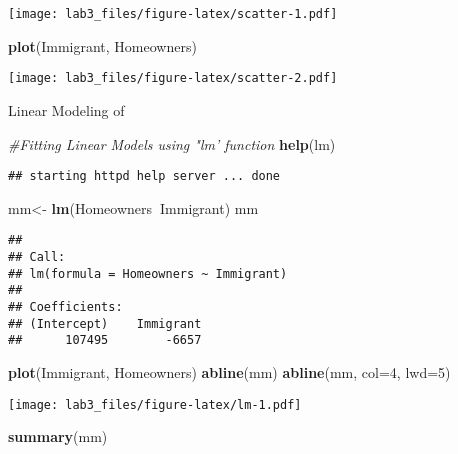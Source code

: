 \documentclass[
]{article}
\newenvironment{Shaded}{\begin{snugshade}}{\end{snugshade}}
\newcommand{\CommentTok}[1]{\textcolor[rgb]{0.56,0.35,0.01}{\textit{#1}}}
\newcommand{\DataTypeTok}[1]{\textcolor[rgb]{0.13,0.29,0.53}{#1}}
\newcommand{\DecValTok}[1]{\textcolor[rgb]{0.00,0.00,0.81}{#1}}
\newcommand{\KeywordTok}[1]{\textcolor[rgb]{0.13,0.29,0.53}{\textbf{#1}}}
\newcommand{\NormalTok}[1]{#1}
\newcommand{\OperatorTok}[1]{\textcolor[rgb]{0.81,0.36,0.00}{\textbf{#1}}}
\newcommand{\StringTok}[1]{\textcolor[rgb]{0.31,0.60,0.02}{#1}}
\begin{document}
\texttt{[image: lab3\_files/figure-latex/scatter-1.pdf]}

\begin{Shaded}
\begin{Highlighting}[]
\KeywordTok{plot}\NormalTok{(Immigrant, Homeowners)}
\end{Highlighting}
\end{Shaded}

\texttt{[image: lab3\_files/figure-latex/scatter-2.pdf]}

Linear Modeling of

\begin{Shaded}
\begin{Highlighting}[]
\CommentTok{#Fitting Linear Models using "lm' function}
\KeywordTok{help}\NormalTok{(lm)}
\end{Highlighting}
\end{Shaded}

\begin{verbatim}
## starting httpd help server ... done
\end{verbatim}

\begin{Shaded}
\begin{Highlighting}[]
\NormalTok{mm<-}\StringTok{ }\KeywordTok{lm}\NormalTok{(Homeowners}\OperatorTok{~}\NormalTok{Immigrant)}
\NormalTok{mm}
\end{Highlighting}
\end{Shaded}

\begin{verbatim}
## 
## Call:
## lm(formula = Homeowners ~ Immigrant)
## 
## Coefficients:
## (Intercept)    Immigrant  
##      107495        -6657
\end{verbatim}

\begin{Shaded}
\begin{Highlighting}[]
\KeywordTok{plot}\NormalTok{(Immigrant, Homeowners)}
\KeywordTok{abline}\NormalTok{(mm)}
\KeywordTok{abline}\NormalTok{(mm, }\DataTypeTok{col=}\DecValTok{4}\NormalTok{, }\DataTypeTok{lwd=}\DecValTok{5}\NormalTok{)}
\end{Highlighting}
\end{Shaded}

\texttt{[image: lab3\_files/figure-latex/lm-1.pdf]}

\begin{Shaded}
\begin{Highlighting}[]
\KeywordTok{summary}\NormalTok{(mm)}
\end{Highlighting}
\end{Shaded}
\end{document}

